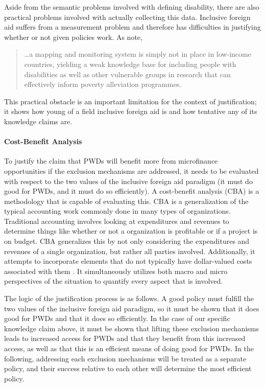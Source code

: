 \documentclass[a4paper]{article}
\begin{document}
Aside from the semantic problems involved with defining disability, there are
also practical problems involved with actually collecting this data.
Inclusive foreign aid suffers from a measurement problem and therefore has
difficulties in justifying whether or not given policies work. As
\cite{ingstad2011disability} note,
%
\begin{quote}
    \ldots a mapping and monitoring system is simply not in place in
    low-income countries, yielding a weak knowledge base for including people
    with disabilities as well as other vulnerable groups in research that can
    effectively inform poverty alleviation programmes.
\end{quote}
%
This practical obstacle is an important limitation for the context of
justification; it shows how young of a field inclusive foreign aid is and how
tentative any of its knowledge claims are.

\paragraph{Cost-Benefit Analysis}

To justify the claim that PWDs will benefit more from microfinance
opportunities if the exclusion mechanisms are addressed, it needs to be
evaluated with respect to the two values of the inclusive foreign aid paradigm
(it must do good for PWDs, and it must do so efficiently). A cost-benefit
analysis (CBA) is a methodology that is capable of evaluating this. CBA is a
generalization of the typical accounting work commonly done in many types of
organizations. Traditional accounting involves looking at expenditures and
revenues to determine things like whether or not a organization is profitable
or if a project is on budget. CBA generalizes this by not only considering the
expenditures and revenues of a single organization, but rather all parties
involved. Additionally, it attempts to incorporate elements that do not
typically have dollar-valued costs associated with them
\citep{mishan2015elements}. It simultaneously utilizes both macro and micro
perspectives of the situation to quantify every aspect that is involved.

The logic of the justification process is as follows. A good policy must
fulfill the two values of the inclusive foreign aid paradigm, so it must be
shown that it does good for PWDs and that it does so efficiently. In the case
of our specific knowledge claim above, it must be shown that lifting these
exclusion mechanisms leads to increased access for PWDs and that they benefit
from this increased access, as well as that this is an efficient means of
doing good for PWDs. In the following, addressing each exclusion mechanisms
will be treated as a separate policy, and their success relative to each other
will determine the most efficient policy.
\end{document}

